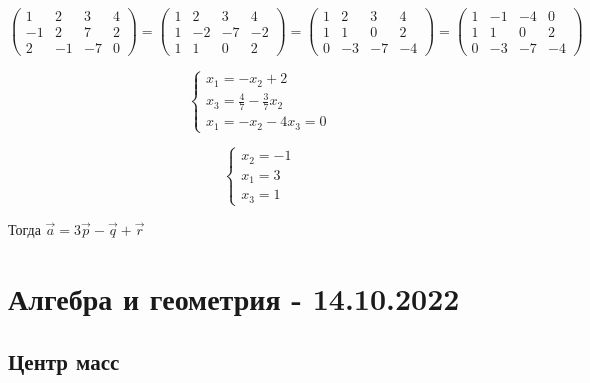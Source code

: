 \documentclass{article}
\begin{document}
$
\begin{pmatrix}
    1 & 2 & 3 & 4 \\
    -1 & 2 & 7 & 2 \\
    2 & -1 & -7 & 0
\end{pmatrix} = \begin{pmatrix}
    1 & 2 & 3 & 4 \\
    1 & -2 & -7 & -2 \\
    1 & 1 & 0 & 2
\end{pmatrix} = \begin{pmatrix}
    1 & 2 & 3 & 4 \\
    1 & 1 & 0 & 2 \\
    0 & -3 & -7 & -4
\end{pmatrix} = \begin{pmatrix}
    1 & -1 & -4 & 0 \\
    1 & 1 & 0 & 2 \\
    0 & -3 & -7 & -4
\end{pmatrix}
$

\begin{equation}
\begin{cases}
    x_1 = -x_2 + 2 \\
    x_3 = \frac{4}{7} - \frac{3}{7}x_2 \\
    x_1 = -x_2-4x_3 = 0
\end{cases}
\end{equation}

\begin{equation}
    \begin{cases}
        x_2 = -1 \\
        x_1 = 3 \\
        x_3 = 1
    \end{cases}
\end{equation}

Тогда $\overrightarrow{a} = 3\overrightarrow{p} - \overrightarrow{q} + \overrightarrow{r}$

\pagebreak
\section{Алгебра и геометрия - 14.10.2022}

\subsection{Центр масс}
\end{document}
